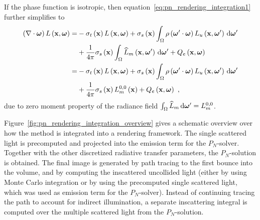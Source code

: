 If the phase function is isotropic, then equation~\ref{eq:pn_rendering_integration1} further simplifies to
\begin{align}
\left(\nabla\cdot\boldsymbol{\mathbf{\omega}}\right)L\left(\boldsymbol{\mathbf{x}}, \boldsymbol{\mathbf{\omega}} \right)
=&
-\sigma_t\left(\boldsymbol{\mathbf{x}}\right) L\left(\boldsymbol{\mathbf{x}}, \boldsymbol{\mathbf{\omega}} \right)
+\sigma_s\left(\boldsymbol{\mathbf{x}}\right) \int_{\Omega}
{
\rho\left(\boldsymbol{\mathbf{\omega}}'\cdot\boldsymbol{\mathbf{\omega}}\right)L_u\left(\boldsymbol{\mathbf{x}}, \boldsymbol{\mathbf{\omega}}' \right)\,\mathrm{d}\boldsymbol{\mathbf{\omega}}'
}
\nonumber\\
&
+
\frac{1}{4\pi}
\sigma_s\left(\boldsymbol{\mathbf{x}}\right)
\int_{\Omega}
{
\widehat{L}_m\left(\boldsymbol{\mathbf{x}}, \boldsymbol{\mathbf{\omega}}' \right)\,\mathrm{d}\boldsymbol{\mathbf{\omega}}'
}
+Q_e\left(\boldsymbol{\mathbf{x}}, \boldsymbol{\mathbf{\omega}}\right)
\nonumber\\
=&
-\sigma_t\left(\boldsymbol{\mathbf{x}}\right) L\left(\boldsymbol{\mathbf{x}}, \boldsymbol{\mathbf{\omega}} \right)
+\sigma_s\left(\boldsymbol{\mathbf{x}}\right) \int_{\Omega}
{
\rho\left(\boldsymbol{\mathbf{\omega}}'\cdot\boldsymbol{\mathbf{\omega}}\right)L_u\left(\boldsymbol{\mathbf{x}}, \boldsymbol{\mathbf{\omega}}' \right)\,\mathrm{d}\boldsymbol{\mathbf{\omega}}'
}
\nonumber\\
&
+
\frac{1}{4\pi}
\sigma_s\left(\boldsymbol{\mathbf{x}}\right)
L_m^{0,0}\left(\boldsymbol{\mathbf{x}}\right)
+Q_e\left(\boldsymbol{\mathbf{x}}, \boldsymbol{\mathbf{\omega}}\right)
\ ,
\label{eq:pn_rendering_integration2}
\end{align}
due to zero moment property of the radiance field $\int_{\Omega}\widehat{L}_m\,\mathrm{d}\boldsymbol{\mathbf{\omega}}'=L_m^{0,0}$.

Figure~\ref{fig:pn_rendering_integration_overview} gives a schematic overview over how the method is integrated into a rendering framework. The single scattered light is precomputed and projected into the emission term for the $P_N$-solver. Together with the other discretized radiative transfer parameters, the $P_N$-solution is obtained. The final image is generated by path tracing to the first bounce into the volume, and by computing the inscattered uncollided light (either by using Monte Carlo integration or by using the precomputed single scattered light, which was used as emission term for the $P_N$-solver). Instead of continuing tracing the path to account for indirect illumination, a separate inscattering integral is computed over the multiple scattered light from the $P_N$-solution.

